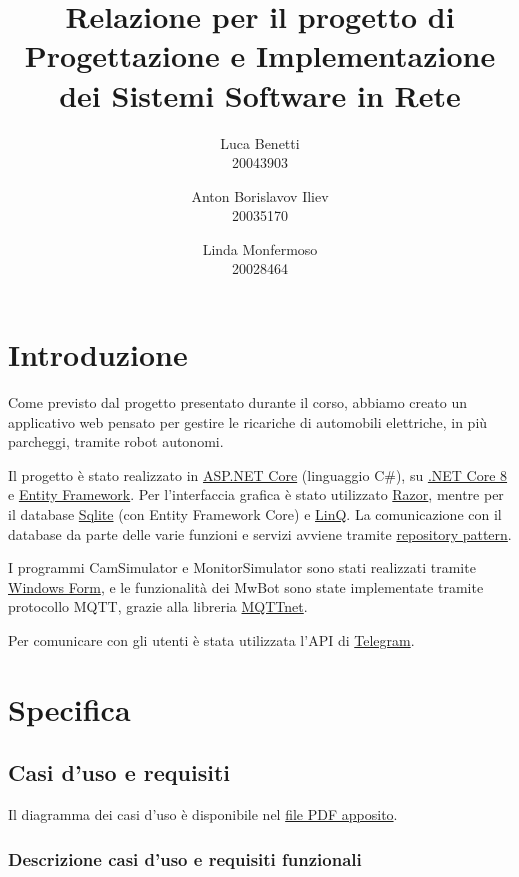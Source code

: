 \documentclass{article}
\title{Relazione per il progetto di Progettazione e Implementazione dei Sistemi Software in Rete}
\author{
  Luca Benetti\\
  20043903
  \and
  Anton Borislavov Iliev\\
  20035170
  \and
  Linda Monfermoso\\
  20028464
}
\begin{document}
\maketitle

\section{Introduzione}
Come previsto dal progetto presentato durante il corso, abbiamo creato un applicativo web pensato per gestire le ricariche di automobili elettriche, in più parcheggi, tramite robot autonomi.

Il progetto è stato realizzato in \href{https://dotnet.microsoft.com/en-us/apps/aspnet}{ASP.NET Core} (linguaggio C\#), su \href{https://dotnet.microsoft.com/en-us/download/dotnet/8.0}{.NET Core 8} e \href{https://learn.microsoft.com/en-us/aspnet/entity-framework}{Entity Framework}. Per l'interfaccia grafica è stato utilizzato \href{https://learn.microsoft.com/en-us/aspnet/core/razor-pages/?view=aspnetcore-8.0&tabs=visual-studio}{Razor}, mentre per il database \href{https://www.sqlite.org/index.html}{Sqlite} (con Entity Framework Core) e \href{https://learn.microsoft.com/en-us/dotnet/csharp/linq/}{LinQ}. La comunicazione con il database da parte delle varie funzioni e servizi avviene tramite \href{https://learn.microsoft.com/it-it/dotnet/architecture/microservices/microservice-ddd-cqrs-patterns/infrastructure-persistence-layer-design}{repository pattern}.

I programmi CamSimulator e MonitorSimulator sono stati realizzati tramite \href{https://learn.microsoft.com/en-us/visualstudio/ide/create-csharp-winform-visual-studio?view=vs-2022}{Windows Form}, e le funzionalità dei MwBot sono state implementate tramite protocollo MQTT, grazie alla libreria \href{https://github.com/dotnet/MQTTnet}{MQTTnet}.

Per comunicare con gli utenti è stata utilizzata l'API di \href{https://github.com/TelegramBots/Telegram.Bot}{Telegram}.
\section{Specifica}
\subsection{Casi d'uso e requisiti}
Il diagramma dei casi d'uso è disponibile nel \href{run:./casi d'uso.pdf}{file PDF apposito}.
\subsubsection{Descrizione casi d'uso e requisiti funzionali}
\end{document}
